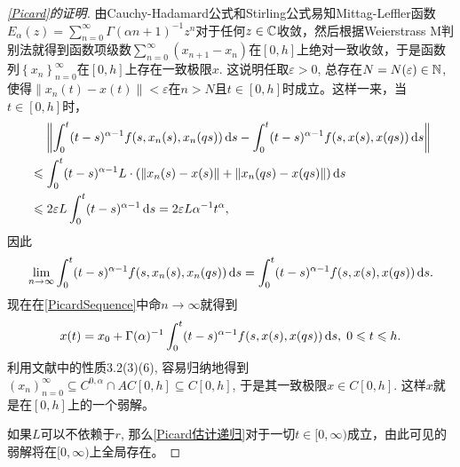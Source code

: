 \begin{proof}[\cref{Picard}的证明]
    由Cauchy-Hadamard公式和Stirling公式易知Mittag-Leffler函数\cite{book}$E_\alpha(z)=\sum_{n=0}^{\infty}\Gamma(\alpha n+1)^{-1}z^n$对于任何$z\in \mathbb{C}$收敛，然后根据Weierstrass M判别法就得到函数项级数$\sum_{n=0}^\infty \left(x_{n+1}-x_n\right)$在$[0,h]$上绝对一致收敛，于是函数列$\left\{x_n\right\}_{n=0}^\infty$在$[0,h]$上存在一致极限$x$. 这说明任取$\varepsilon>0$, 总存在$N=N(\varepsilon)\in \mathbb{N}$, 使得$\left\|x_n(t)-x(t)\right\|<\varepsilon$在$n>N$且$t\in [0,h]$时成立。这样一来，当$t\in [0,h]$时，
    \begin{align*}
        &\relphantom{\leqslant} \left\| \int_0^t (t-s)^{\alpha-1} f(s,x_n(s),x_n(qs))\differential s - \int_0^t (t-s)^{\alpha-1} f(s,x(s),x(qs))\differential s \right\|\\
        &\leqslant \int_0^t (t-s)^{\alpha-1} L\cdot\left(\left\|x_n(s)-x(s)\right\|+\left\|x_n(qs)-x(qs)\right\|\right) \differential s\\
        &\leqslant 2\varepsilon L\int_0^t (t-s)^{\alpha-1}\differential s = 2\varepsilon L\alpha^{-1}t^\alpha,
    \end{align*}
    因此
    \begin{equation*}
        \lim_{n\to\infty} \int_0^t (t-s)^{\alpha-1} f(s,x_n(s),x_n(qs))\mathop{}\!\mathrm{d} s = \int_0^t (t-s)^{\alpha-1} f(s,x(s),x(qs))\mathop{}\!\mathrm{d} s.
    \end{equation*}
    现在在\cref{PicardSequence}中命$n\to\infty$就得到
    \begin{equation*}
        x(t)=x_0 + \Gamma(\alpha)^{-1}\int_0^t (t-s)^{\alpha-1} f(s,x(s),x(qs))\mathop{}\!\mathrm{d} s,\;0\leqslant t\leqslant h.
    \end{equation*}
    利用文献中的性质3.2(3)(6), 容易归纳地得到$\left(x_n\right)_{n=0}^\infty \subseteq C^{0,\alpha} \cap AC [0,h] \subseteq C[0,h]$, 于是其一致极限$x\in C[0,h]$. 这样$x$就是\mainEquation 在$[0,h]$上的一个弱解。

    如果$L$可以不依赖于$r$, 那么\cref{Picard估计递归}对于一切$t\in [0,\infty)$成立，由此可见\mainEquation 的弱解将在$[0,\infty)$上全局存在。


\end{proof}
